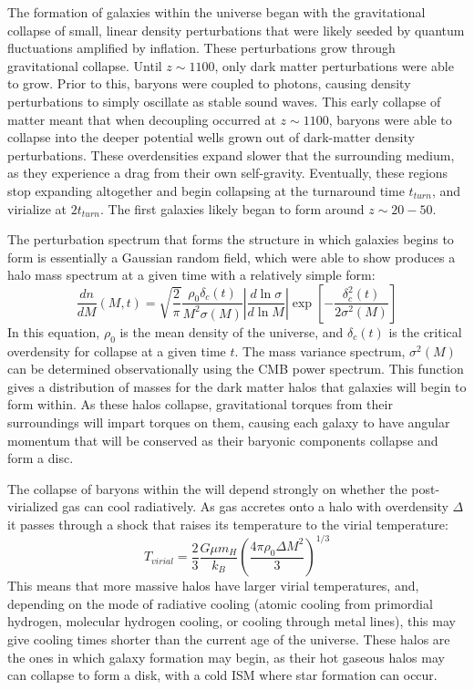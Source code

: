 The formation of galaxies within the universe began with the gravitational
collapse of small, linear density perturbations that were likely seeded by
quantum fluctuations amplified by inflation.  These perturbations grow through
gravitational collapse.  Until $z\sim1100$, only dark matter perturbations were
able to grow.  Prior to this, baryons were coupled to photons, causing density
perturbations to simply oscillate as stable sound waves.  This early collapse of
matter meant that when decoupling occurred at $z\sim1100$, baryons were able to
collapse into the deeper potential wells grown out of dark-matter density
perturbations.  These overdensities expand slower that the surrounding medium,
as they experience a drag from their own self-gravity.  Eventually, these
regions stop expanding altogether and begin collapsing at the turnaround time
$t_{turn}$, and virialize at $2t_{turn}$. The first galaxies likely began to
form around $z\sim20-50$.


The perturbation spectrum that forms the structure in which galaxies begins to
form is essentially a Gaussian random field, which \citet{Press1974} were able
to show produces a halo mass spectrum at a given time with a relatively simple form:
\begin{equation}
    \frac{dn}{dM}(M,t) =
    \sqrt{\frac{2}{\pi}}\frac{\rho_0\delta_c(t)}{M^2\sigma(M)} 
    \left\lvert\frac{d\ln{\sigma}}{d\ln{M}}\right\rvert
    \exp{\left[-\frac{\delta^2_c(t)}{2\sigma^2(M)}\right]}
\end{equation}
In this equation, $\rho_0$ is the mean density of the universe, and $\delta_c(t)$
is the critical overdensity for collapse at a given time $t$.  The mass variance
spectrum, $\sigma^2(M)$ can be determined observationally using the CMB power
spectrum.  This function gives a distribution of masses for the dark matter
halos that galaxies will begin to form within.  As these halos collapse,
gravitational torques from their surroundings will impart torques on them,
causing each galaxy to have angular momentum that will be conserved as their
baryonic components collapse and form a disc.

The collapse of baryons within the will depend strongly on whether the
post-virialized gas can cool radiatively.  As gas accretes onto a halo with
overdensity $\Delta$ it passes through a shock that raises its temperature to
the virial temperature:
\begin{equation}
    T_{virial} = \frac{2}{3}\frac{G\mu m_H}{k_B}\left({\frac{4\pi\rho_0\Delta
    M^2}{3}}\right)^{1/3}
\end{equation}
This means that more massive halos have larger virial temperatures, and,
depending on the mode of radiative cooling (atomic cooling from primordial
hydrogen, molecular hydrogen cooling, or cooling through metal lines), this may
give cooling times shorter than the current age of the universe.  These halos 
are the ones in which galaxy formation may begin, as their hot gaseous halos may
can collapse to form a disk, with a cold ISM where star formation can occur.

